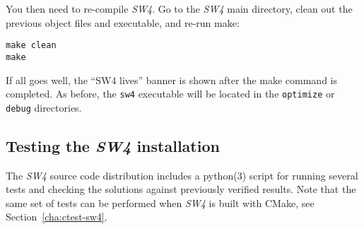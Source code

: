 \documentclass[11pt]{article}
\begin{document}
You then need to re-compile \emph{SW4}. Go to the \emph{SW4} main directory, clean out the previous
object files and executable, and re-run make:
\begin{verbatim}
make clean
make
\end{verbatim}
If all goes well, the ``SW4 lives'' banner is shown after the make command is
completed. As before, the \verb+sw4+ executable will be located in the \verb+optimize+ or
\verb+debug+ directories.

\subsection{Testing the \emph{SW4} installation}
The \emph{SW4} source code distribution includes a python(3) script for running several tests and
checking the solutions against previously verified results. Note that the same set of tests can be
performed when \emph{SW4} is built with CMake, see Section~\ref{cha:ctest-sw4}.
\end{document}
